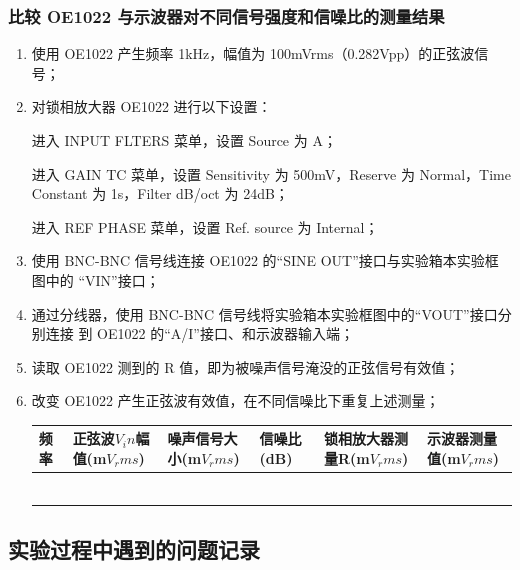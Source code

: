 \documentclass[11pt,a4paper]{ctexart}
\begin{document}
	\subsubsection{比较 OE1022 与示波器对不同信号强度和信噪比的测量结果}
	\begin{enumerate}
		\item 使用 OE1022 产生频率 1kHz，幅值为 100mVrms（0.282Vpp）的正弦波信号；
		\item 对锁相放大器 OE1022 进行以下设置：
		
		进入 INPUT FLTERS 菜单，设置 Source 为 A；
		
		进入 GAIN TC 菜单，设置 Sensitivity 为 500mV，Reserve 为 Normal，Time Constant
		为 1s，Filter dB/oct 为 24dB；
		
		进入 REF PHASE 菜单，设置 Ref. source 为 Internal；
		\item 使用 BNC-BNC 信号线连接 OE1022 的“SINE OUT”接口与实验箱本实验框图中的
		“VIN”接口；
		\item 通过分线器，使用 BNC-BNC 信号线将实验箱本实验框图中的“VOUT”接口分别连接
		到 OE1022 的“A/I”接口、和示波器输入端；
		\item 读取 OE1022 测到的 R 值，即为被噪声信号淹没的正弦信号有效值；
		\item 改变 OE1022 产生正弦波有效值，在不同信噪比下重复上述测量；
		
		\begin{table}[H]
			\centering
			\begin{tabular}{|  p{2cm} | p{2cm} | p{2cm} | p{2cm} | p{2cm} | p{2cm} |}
				\hline
				频率 & 正弦波$V_in$幅值(m$V_rms$) & 噪声信号大小(m$V_rms$) & 信噪比(dB)&锁相放大器测量R(m$V_rms$) & 示波器测量值(m$V_rms$)\\
				\hline
				&  &  & & &  \\
				\hline
				&  &  &  & & \\
				\hline
				&  &  &  & & \\
				\hline
				&  &  &  & & \\
				\hline
				&  &  &  & & \\
				\hline
				&  &  &  & & \\
				\hline
				
			\end{tabular}
		\end{table}
	\end{enumerate}
\subsection{实验过程中遇到的问题记录}
\newpage
\end{document}
